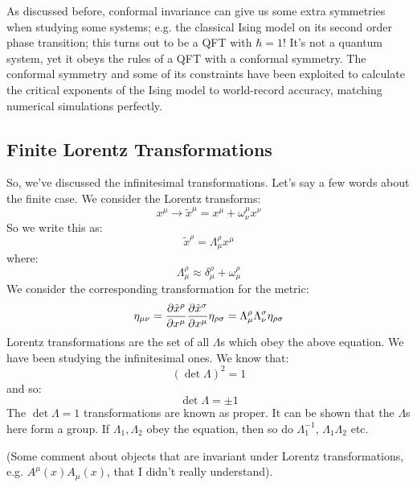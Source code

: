 As discussed before, conformal invariance can give us some extra symmetries when studying some systems; e.g. the classical Ising model on its second order phase transition; this turns out to be a QFT with $\hbar = 1$! It's not a quantum system, yet it obeys the rules of a QFT with a conformal symmetry. The conformal symmetry and some of its constraints have been exploited to calculate the critical exponents of the Ising model to world-record accuracy, matching numerical simulations perfectly.

\subsection{Finite Lorentz Transformations}
So, we've discussed the infinitesimal transformations. Let's say a few words about the finite case. We consider the Lorentz transforms:
\begin{equation}
    x^\mu \to \tilde{x}^\mu = x^\mu + \omega^\mu_\nu x^\nu
\end{equation}
So we write this as:
\begin{equation}
    \tilde{x}^\rho = \Lambda^\rho_{\mu}x^\mu
\end{equation}
where:
\begin{equation}
    \Lambda_\mu^\rho \approx \delta^\rho_\mu + \omega^\rho_\mu
\end{equation}
We consider the corresponding transformation for the metric:
\begin{equation}
    \eta_{\mu\nu} = \frac{\partial \tilde{x}^\rho}{\partial x^\mu}\frac{\partial \tilde{x}^\sigma}{\partial x^\mu}\eta_{\rho\sigma} = \Lambda^\rho_\mu \Lambda^\sigma_\nu \eta_{\rho\sigma}
\end{equation}
Lorentz transformations are the set of all $\Lambda$s which obey the above equation. We have been studying the infinitesimal ones. We know that:
\begin{equation}
    (\det \Lambda)^2 = 1
\end{equation}
and so:
\begin{equation}
    \det \Lambda = \pm 1
\end{equation}
The $\det \Lambda = 1$ transformations are known as proper. It can be shown that the $\Lambda$s here form a group. If $\Lambda_1, \Lambda_2$ obey the equation, then so do $\Lambda_1^{-1}$, $\Lambda_1\Lambda_2$ etc.

(Some comment about objects that are invariant under Lorentz transformations, e.g. $A^\mu(x)A_\mu(x)$, that I didn't really understand).